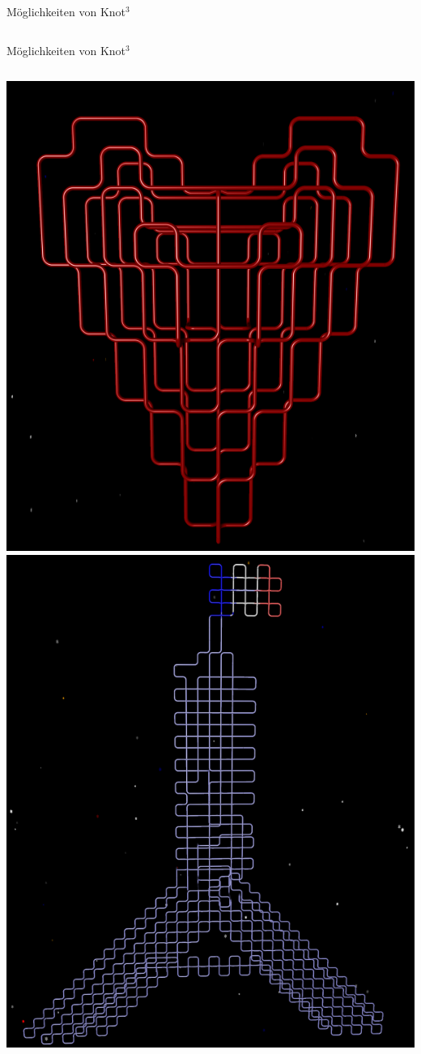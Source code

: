\documentclass[18pt]{beamer}
\begin{document}
\begin{frame}{Möglichkeiten von Knot$^3$}
\begin{columns}[c]
\end{columns}
\end{frame}

\begin{frame}{Möglichkeiten von Knot$^3$}

\begin{columns}[c]
 \includegraphics[scale=0.35]{herz}
 \includegraphics[scale=0.33]{eifelturm}

\end{columns}
\end{frame}
\end{document}

